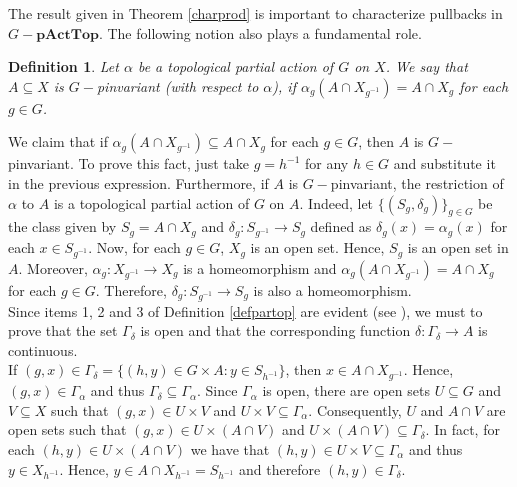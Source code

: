 \documentclass[sn-mathphys-num]{sn-jnl}%
\theoremstyle{thmstyleone}%
\theoremstyle{thmstyletwo}%
\theoremstyle{thmstylethree}%
\newtheorem{definition}{Definition}%
\begin{document}

The result given in Theorem \ref{charprod} is important to characterize pullbacks in $G-\mathbf{pActTop}$. The following notion also plays a fundamental role.\\

\begin{definition}
Let $ \alpha $ be a topological partial  action of $ G $ on $ X $. We say that $ A \subseteq X $ is $ G-$pinvariant (with respect to $ \alpha $), if $ \alpha_g (A \cap X_ {g^{-1}}) = A \cap X_g $ for each $ g \in G $.\\
\end{definition}
We  claim that if $ \alpha_g (A \cap X_{g^{- 1}}) \subseteq A \cap X_g $ for each $ g \in G $, then $ A $ is $G-$pinvariant. To prove this fact, just take $g=h^{-1}$ for any $h\in G$ and substitute it in the previous expression.
Furthermore, if $ A $ is $ G-$pinvariant, the restriction of $ \alpha $ to $ A $ is a topological partial action of $ G $ on $ A $.
Indeed, let  $ \{(S_g, \delta_g) \} _ {g \in G} $ be  the class   given by $ S_g = A \cap X_g  $ and $ \delta_g: S_ {g^{- 1}} \to S_g $  defined as $ \delta_g (x) = \alpha_g (x) $ for each $ x \in S_ {g^{- 1}} $.
Now, for each $ g \in G $, $ X_g  $ is an open set. Hence, $ S_g $ is an open set in $A$.
Moreover,  $ \alpha_g: X_{g^{- 1}} \to X_g $ is a homeomorphism  and $ \alpha_g (A \cap X_ {g^{-1}}) = A \cap X_g $ for each $ g \in G $.
Therefore, $ \delta_g: S_{g^{- 1}} \to S_g $  is also a homeomorphism.\\

Since items 1, 2 and 3 of Definition \ref{defpartop} are evident (see \cite{Avila1}), we must to prove that the set $\Gamma_{\delta}$ is open and that the corresponding function $ \delta: \Gamma_{\delta} \to A $ is continuous.\\


If  $ (g, x) \in \Gamma_\delta=\{(h,y)\in G\times A: y \in S_{h^{- 1}}\} $, then $ x \in  A\cap X_{g^{-1}}$. Hence, $ (g, x) \in \Gamma_\alpha $ and thus $ \Gamma_\delta\subseteq \Gamma_\alpha$. Since
    $\Gamma_\alpha$ is open, there are open sets $ U \subseteq G $ and $ V \subseteq X $  such that $ (g, x) \in U \times V $ and $ U \times V \subseteq \Gamma_\alpha $. Consequently, $ U $ and $ A\cap V $ are open sets such that $ (g, x) \in U \times (A\cap V) $ and $ U \times (A\cap V) \subseteq \Gamma_\delta $. In fact, for each $ (h,y) \in U \times (A\cap V)  $ we have that $ (h,y) \in U \times V\subseteq  \Gamma_\alpha $ and thus $ y \in X_{h^{-1}}$. Hence, $ y \in A\cap X_{h^{-1}}=S_{h^{-1}}$  and therefore $ (h, y) \in \Gamma_\delta $.\\
\end{document}
